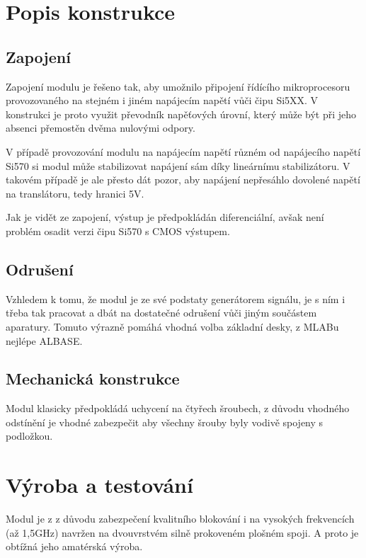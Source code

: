 \documentclass[12pt,a4paper,oneside]{article}
\begin{document}
\section{Popis konstrukce}
\subsection{Zapojení}
Zapojení modulu je řešeno tak, aby umožnilo připojení řídícího mikroprocesoru provozovaného na stejném i jiném napájecím napětí vůči čipu Si5XX. V konstrukci je proto využit převodník napěťových úrovní, který může být při jeho absenci přemostěn dvěma nulovými odpory.

V případě provozování modulu na napájecím napětí různém od napájecího napětí Si570 si modul může stabilizovat napájení sám díky lineárnímu stabilizátoru. V takovém případě je ale přesto dát pozor, aby napájení nepřesáhlo dovolené napětí na translátoru, tedy hranici 5V.  



Jak je vidět ze zapojení, výstup je předpokládán diferenciální, avšak není problém osadit verzi čipu Si570 s CMOS výstupem. 

\subsection{Odrušení}

Vzhledem k tomu, že modul je ze své podstaty generátorem signálu, je s ním i třeba tak pracovat a dbát na dostatečné odrušení vůči jiným součástem aparatury. Tomuto výrazně pomáhá vhodná volba základní desky, z MLABu nejlépe ALBASE.

\subsection{Mechanická konstrukce}

Modul klasicky předpokládá uchycení na čtyřech šroubech, z důvodu vhodného odstínění je vhodné zabezpečit aby všechny šrouby byly vodivě spojeny s podložkou.  

\section{Výroba a testování}
Modul je z z důvodu zabezpečení kvalitního blokování i na vysokých frekvencích (až 1,5GHz) navržen na dvouvrstvém silně prokoveném plošném spoji. A proto je obtížná jeho amatérská výroba.
\end{document}
